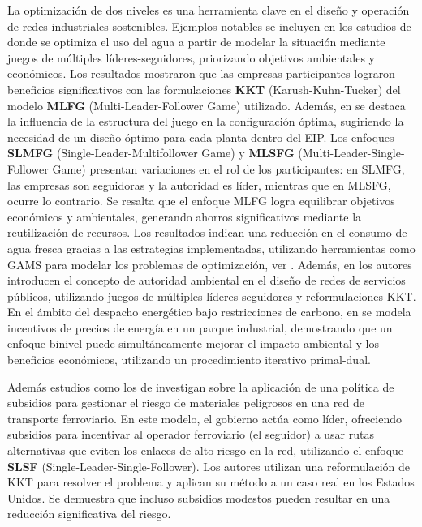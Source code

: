 La optimización de dos niveles es una herramienta clave en el diseño y operación de redes industriales sostenibles. Ejemplos notables se incluyen
en los estudios de \cite{Ramos2016WaterII} donde se optimiza el uso del agua a partir de modelar la situación mediante juegos de múltiples líderes-seguidores, priorizando objetivos ambientales y económicos. Los resultados mostraron que las empresas participantes lograron beneficios significativos con las formulaciones \textbf{KKT} (Karush-Kuhn-Tucker) del modelo \textbf{MLFG} (Multi-Leader-Follower Game) utilizado.
Además, en \cite{Ramos2016WaterII} se destaca la influencia de la estructura del juego en la configuración óptima, sugiriendo la necesidad de un diseño óptimo para cada planta dentro del EIP. 
Los enfoques \textbf{SLMFG} (Single-Leader-Multifollower Game) y \textbf{MLSFG} (Multi-Leader-Single-Follower Game) presentan variaciones en el rol de los participantes: en SLMFG, las empresas son seguidoras y la autoridad es líder, mientras que en MLSFG, ocurre lo contrario. Se resalta que el enfoque MLFG logra equilibrar objetivos económicos y ambientales, generando ahorros significativos mediante la reutilización de recursos. Los resultados indican una reducción en el consumo de agua fresca gracias a las estrategias implementadas, utilizando herramientas como GAMS para modelar los problemas de optimización, ver \cite{Ramos2016WaterII}. 
Además, en \cite{Ramos2018UtilityNO} los autores introducen el concepto de autoridad ambiental en el diseño de redes de servicios públicos, utilizando juegos de múltiples líderes-seguidores y reformulaciones KKT. 
En el ámbito del despacho energético bajo restricciones de carbono, en \cite{Gu2020BilevelOL} se modela incentivos de precios de energía en un parque industrial, demostrando que un enfoque binivel puede simultáneamente mejorar el impacto ambiental y los beneficios económicos, utilizando un procedimiento iterativo primal-dual.

Además estudios como los de \cite{Bhavsar2021ASP} investigan sobre la aplicación de una política de subsidios para gestionar el riesgo de materiales peligrosos en una red de transporte ferroviario. En este modelo, el gobierno actúa como líder, ofreciendo subsidios para incentivar al operador ferroviario (el seguidor) a usar rutas alternativas que eviten los enlaces de alto riesgo en la red, utilizando el enfoque \textbf{SLSF} (Single-Leader-Single-Follower). Los autores utilizan una reformulación de KKT para resolver el problema y aplican su método a un caso real en los Estados Unidos. Se demuestra que incluso subsidios modestos pueden resultar en una reducción significativa del riesgo.


